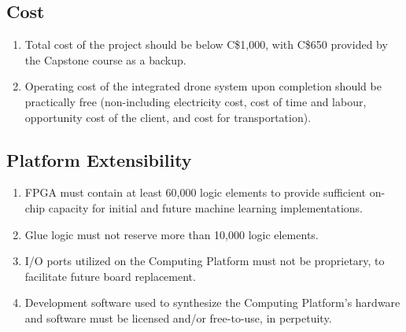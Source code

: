 \documentclass[10pt,letterpaper]{article}
\begin{document}
\subsection{Cost}
\begin{enumerate}[label=C.CT.\arabic*, wide=1cm, widest=3cm, leftmargin=*, font=\bfseries, noitemsep,topsep=0pt, parsep=4pt, partopsep=0pt]
    \item Total cost of the project should be below C\$1,000, with C\$650 provided by the Capstone course as a backup.
    \item Operating cost of the integrated drone system upon completion should be practically free (non-including electricity cost, cost of time and labour, opportunity cost of the client, and cost for transportation).
\end{enumerate}

\subsection{Platform Extensibility}
\begin{enumerate}[label=C.EX.\arabic*, wide=1cm, widest=3cm, leftmargin=*, font=\bfseries, noitemsep,topsep=0pt, parsep=4pt, partopsep=0pt]
    \item FPGA must contain at least 60,000 logic elements to provide sufficient on-chip capacity for initial and future machine learning implementations.
    \item Glue logic must not reserve more than 10,000 logic elements.
    \item I/O ports utilized on the Computing Platform must not be proprietary, to facilitate future board replacement.
    \item Development software used to synthesize the Computing Platform's hardware and software must be licensed and/or free-to-use, in perpetuity.
\end{enumerate}
\end{document}
